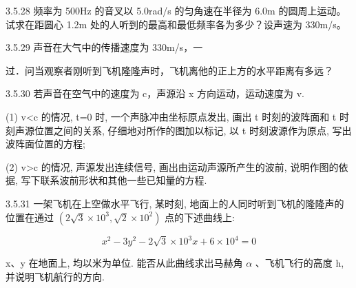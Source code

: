 \begin{problem}{3.5.28}
频率为 500Hz 的音叉以 5.0rad/s 的匀角速在半径为 6.0m 的圆周上运动。试求在距圆心 1.2m 处的人听到的最高和最低频率各为多少？设声速为 330m/s。
\end{problem}
\clearpage


\begin{problem}{3.5.29}
声音在大气中的传播速度为 330m/s，一

过．问当观察者刚听到飞机隆隆声时，飞机离他的正上方的水平距离有多远？
\end{problem}
\clearpage


\begin{problem}{3.5.30}
若声音在空气中的速度为 c，声源沿 x 方向运动，运动速度为 v.

(1) v<c 的情况, t=0 时, 一个声脉冲由坐标原点发出, 画出 t 时刻的波阵面和 t 时刻声源位置之间的关系, 仔细地对所作的图加以标记, 以 t 时刻波源作为原点, 写出波阵面位置的方程;

(2) v>c 的情况, 声源发出连续信号, 画出由运动声源所产生的波前, 说明作图的依据, 写下联系波前形状和其他一些已知量的方程.
\end{problem}
\clearpage


\begin{problem}{3.5.31}
一架飞机在上空做水平飞行, 某时刻, 地面上的人同时听到飞机的隆隆声的位置在通过 $(2\sqrt{3} \times 10^{3}, \sqrt{2} \times 10^{2})$ 点的下述曲线上:

\[
x ^ {2} - 3 y ^ {2} - 2 \sqrt {3} \times 1 0 ^ {3} x + 6 \times 1 0 ^ {4} = 0
\]

x、y 在地面上, 均以米为单位. 能否从此曲线求出马赫角 $\alpha$ 、飞机飞行的高度 h, 并说明飞机航行的方向.
\end{problem}
\clearpage

